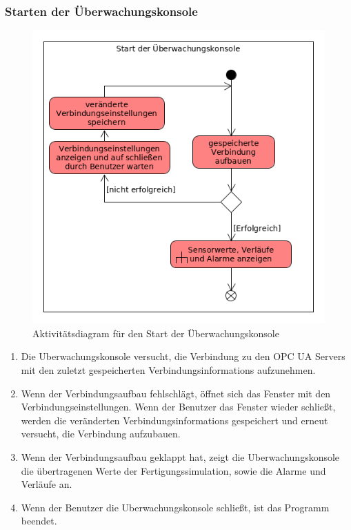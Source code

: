 \documentclass[parskip=full]{scrartcl}
\begin{document}
\subsubsection{Starten der Überwachungskonsole}
\label{console-launch}
\begin{figure}[H]
  \centering
  \includegraphics[scale=0.62]{media/Activities/launch-console.png}
  \caption{Aktivitätsdiagram für den Start der Überwachungskonsole}
\end{figure}
\begin{enumerate}[noitemsep]
 \item Die \gls{Uberwachungskonsole} versucht, die Verbindung zu den \glspl{OPC UA Server} mit den zuletzt gespeicherten \glspl{Verbindungsinformation} aufzunehmen.
 \item Wenn der Verbindungsaufbau fehlschlägt, öffnet sich das Fenster mit den Verbindungseinstellungen. Wenn der Benutzer das Fenster wieder schließt,
 werden die veränderten \glspl{Verbindungsinformation} gespeichert und erneut versucht, die Verbindung aufzubauen.
 \item Wenn der Verbindungsaufbau geklappt hat, zeigt die \gls{Uberwachungskonsole} die übertragenen Werte der \gls{Fertigungssimulation}, sowie die
 Alarme und Verläufe an.
 \item Wenn der Benutzer die \gls{Uberwachungskonsole} schließt, ist das Programm beendet.
\end{enumerate}
\end{document}
